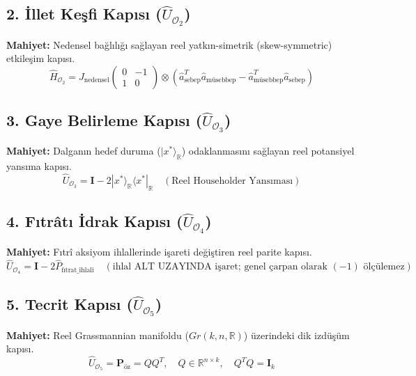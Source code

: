 \documentclass[11pt, a4paper]{article}
\begin{document}
\subsection{2. İllet Keşfi Kapısı ($\hat{U}_{\mathcal{O}_2}$)}
\textbf{Mahiyet:} Nedensel bağlılığı sağlayan reel yatkın-simetrik (skew-symmetric) etkileşim kapısı.
\begin{equation}
\hat{H}_{\mathcal{O}_2} = J_{\text{nedensel}} \begin{pmatrix} 0 & -1 \\ 1 & 0 \end{pmatrix} \otimes (\hat{a}_{\text{sebep}}^T \hat{a}_{\text{müsebbep}} - \hat{a}_{\text{müsebbep}}^T \hat{a}_{\text{sebep}})
\end{equation}

\subsection{3. Gaye Belirleme Kapısı ($\hat{U}_{\mathcal{O}_3}$)}
\textbf{Mahiyet:} Dalganın hedef duruma ($|x^*\rangle_{\mathbb{R}}$) odaklanmasını sağlayan reel potansiyel yansıma kapısı.
\begin{equation}
\hat{U}_{\mathcal{O}_3} = \mathbf{I} - 2 |x^*\rangle_{\mathbb{R}} \langle x^*|_{\mathbb{R}} \quad (\text{Reel Householder Yansıması})
\end{equation}

\subsection{4. Fıtrâtı İdrak Kapısı ($\hat{U}_{\mathcal{O}_4}$)}
\textbf{Mahiyet:} Fıtrî aksiyom ihlallerinde işareti değiştiren reel parite kapısı.
\begin{equation}
\hat{U}_{\mathcal{O}_4} = \mathbf{I} - 2 \hat{P}_{\text{fıtrat\_ihlali}} \quad (\text{ihlal ALT UZAYINDA işaret; genel çarpan olarak $(-1)$ ölçülemez})
\end{equation}

\subsection{5. Tecrit Kapısı ($\hat{U}_{\mathcal{O}_5}$)}
\textbf{Mahiyet:} Reel Grassmannian manifoldu ($Gr(k, n, \mathbb{R})$) üzerindeki dik izdüşüm kapısı.
\begin{equation}
\hat{U}_{\mathcal{O}_5} = \mathbf{P}_{\text{öz}} = Q Q^T, \quad Q \in \mathbb{R}^{n \times k}, \quad Q^T Q = \mathbf{I}_k
\end{equation}
\end{document}
